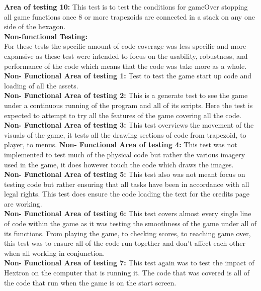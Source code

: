 \documentclass[12pt, titlepage]{article}
\begin{document}
\textbf{Area of testing 10:} This test is to test the conditions for gameOver stopping all game functions once 8 or more trapezoids are connected in a stack on any one side of the hexagon. \\

\noindent \textbf{Non-functional Testing:} \\

For these tests the specific amount of code coverage was less specific and more expansive as these test were intended to focus on the usability, robustness, and performance of the code which means that the code was take more as a whole.\\

\textbf{Non- Functional Area of testing 1:} Test to test the game start up code and loading of all the assets. \\

\textbf{
Non- Functional Area of testing 2:} This is a generate test to see the game under a continuous running of the program and all of its scripts. Here the test is expected to attempt to try all the features of the game covering all the code.\\

\textbf{Non- Functional Area of testing 3:} This test overviews the movement of the visuals of the game, it tests all the drawing sections of code from trapezoid, to player, to menus.
\textbf{Non- Functional Area of testing 4:} This test was not implemented to test much of the physical code but rather the various imagery used in the game, it does however touch the code which draws the images. \\

\textbf{Non- Functional Area of testing 5:} This test also was not meant focus on testing code but rather ensuring that all tasks have been in accordance with all legal rights. This test does ensure the code loading the text for the credits page are working.\\

\textbf{Non- Functional Area of testing 6:} This test covers almost every single line of code within the game as it was testing the smoothness of the game under all of its functions. From playing the game, to checking scores, to reaching game over, this test was to ensure all of the code run together and don't affect each other when all working in conjunction. \\

\textbf{Non- Functional Area of testing 7:} This test again was to test the impact of Hextron on the computer that is running it. The code that was covered is all of the code that run when the game is on the start screen.\\
\end{document}
